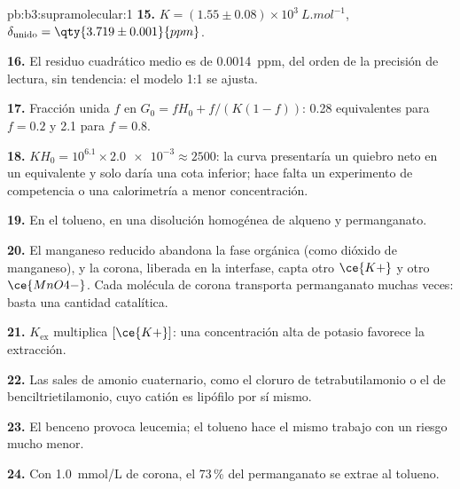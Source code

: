 \begin{solution}{pb:b3:supramolecular:1}
\textbf{15.} $K = (1.55 \pm 0.08) \times 10^3\ \unit{L.mol^{-1}}$, $\delta_{\mathrm{unido}} = \qty{3.719 \pm 0.001}{ppm}$.

\textbf{16.} El residuo cuadrático medio es de \qty{0.0014}{ppm}, del orden de la precisión
de lectura, sin tendencia: el modelo 1:1 se ajusta.

\textbf{17.} Fracción unida $f$ en $G_0 = fH_0 + f/(K(1 - f))$: 0.28 equivalentes para $f = 0.2$ y 2.1 para $f = 0.8$.

\textbf{18.} $KH_0 = 10^{6.1} \times \num{2.0e-3} \approx 2500$: la curva presentaría un quiebro neto en un equivalente
y solo daría una cota inferior; hace falta un experimento de competencia o una calorimetría a
menor concentración.

\textbf{19.} En el tolueno, en una disolución homogénea de alqueno y permanganato.

\textbf{20.} El manganeso reducido abandona la fase orgánica (como dióxido de manganeso),
y la corona, liberada en la interfase, capta otro $\ce{K+}$ y otro $\ce{MnO4-}$. Cada molécula de
corona transporta permanganato muchas veces: basta una cantidad catalítica.

\textbf{21.} $K_{\mathrm{ex}}$ multiplica $[\ce{K+}]$: una concentración alta de potasio favorece la extracción.

\textbf{22.} Las sales de amonio cuaternario, como el cloruro de tetrabutilamonio o el de
benciltrietilamonio, cuyo catión es lipófilo por sí mismo.

\textbf{23.} El benceno provoca leucemia; el tolueno hace el mismo trabajo con un riesgo
mucho menor.

\textbf{24.} Con \qty{1.0}{mmol/L} de corona, el 73\,\% del permanganato se extrae al
tolueno.
\end{solution}
